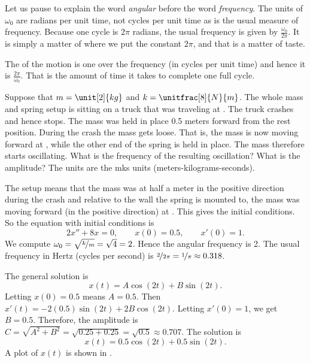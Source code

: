 Let us pause to explain the word \emph{angular}
before the word \emph{frequency}.
The units of
$\omega_0$ are radians per unit time, not cycles per unit time 
as is the usual measure of frequency.  Because one cycle is $2
\pi$ radians, the usual frequency is given by $\frac{\omega_0}{2\pi}$.
It is simply a matter of where we put the constant $2\pi$, and that is a
matter of taste.

The \emph{} of the motion is one over the frequency (in cycles per unit
time) and hence it is $\frac{2\pi}{\omega_0}$.  That is the amount of time it takes
to complete one full cycle.


\begin{example}
Suppose that $m=\unit[2]{kg}$ and $k=\unitfrac[8]{N}{m}$.
The whole mass and spring setup is sitting on
a truck that was traveling at .
The truck crashes and hence stops.
The mass was held in place 0.5 meters forward from the rest position.  During
the crash the mass gets loose.  That is, the mass is now 
moving forward at , while the other end of the
spring is held
in place.  The mass therefore starts oscillating.
What is the frequency of the resulting oscillation?  What is the amplitude?
The units are the mks units (meters-kilograms-seconds).

The setup means that the mass was at half a meter in the positive
direction during the crash and
relative to the wall the spring is mounted to, the mass was moving forward
(in the positive direction) at .  This gives the initial
conditions.
So the equation with initial conditions is
\begin{equation*}
2 x'' + 8 x = 0 , \qquad x(0) = 0.5, \qquad x'(0) = 1.
\end{equation*}
We compute $\omega_0 = \sqrt{\nicefrac{k}{m}} = \sqrt{4} = 2$.
Hence the angular frequency is 2.  The usual frequency in Hertz (cycles per
second) is $\nicefrac{2}{2\pi} = \nicefrac{1}{\pi} \approx 0.318$.

The general solution is
\begin{equation*}
x(t) = A \cos (2t) + B \sin (2t) .
\end{equation*}
Letting $x(0) = 0.5$ means $A = 0.5$.  Then $x'(t) = - 2(0.5) \sin (2t)
+ 2B \cos (2t)$.
Letting $x'(0) = 1$, we get $B = 0.5$.  Therefore, the amplitude is
$C = \sqrt{A^2+B^2} = \sqrt{0.25+0.25} = \sqrt{0.5} \approx 0.707$.  The solution is
\begin{equation*}
x(t) = 0.5 \cos (2t) + 0.5 \sin (2t) .
\end{equation*}
A plot of $x(t)$ is shown in .
\end{example}

